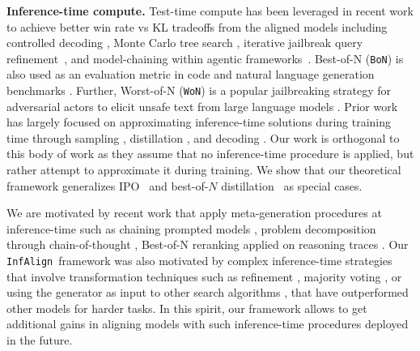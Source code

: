 \documentclass{article}
\newcommand{\iapo}{\texttt{InfAlign}\xspace}
\newcommand{\bofn}{\texttt{BoN}\xspace}
\newcommand{\wofn}{\texttt{WoN}\xspace}
\begin{document}
%
%
%
%

\textbf{Inference-time compute.}
Test-time compute has been leveraged in recent work \citep{snell2024scaling, brown2024large, wu2024empirical} to achieve better win rate vs KL tradeoffs from the aligned models including controlled decoding \citep{mudgal2023controlled, chakraborty2024transfer}, 
Monte Carlo tree search \citep{chaffin-etal-2022-ppl, scialom2021beam, zhaoprobabilistic2024}, 
iterative jailbreak query refinement~\citep{pair}, and model-chaining within agentic frameworks~\citep{gurreal2024}. Best-of-N (\bofn) is also used as an evaluation metric in code and natural language generation benchmarks \citep{stiennon2020learning, chen2021evaluating}. Further, Worst-of-N (\wofn) is a popular jailbreaking strategy for adversarial actors to elicit unsafe text from large language models \citep{hughes2024bestofnjailbreaking}. Prior work has largely focused on approximating inference-time solutions during training time through sampling \citep{gui2024bonbonalignmentlargelanguage, amini2024variationalbestofnalignment}, distillation \citep{sessa2024bondaligningllmsbestofn}, and decoding \citep{qiu2024treebon}. Our work is orthogonal to this body of work as they assume that no inference-time procedure is applied, but rather attempt to approximate it during training. We show that our theoretical framework generalizes IPO~\citep{azar2023general} and best-of-$N$ distillation~\citep{gui2024bonbonalignmentlargelanguage, amini2024variationalbestofnalignment, sessa2024bondaligningllmsbestofn} as special cases. 

We are motivated by recent work that apply meta-generation procedures \citep{welleck2024decoding} at inference-time such as chaining prompted models \citep{brown2024large}, problem decomposition through chain-of-thought \citep{wei2022chain}, Best-of-N reranking \citep{collins-koo-2005-discriminative, charniak-johnson-2005-coarse, pauls-klein-2009-k} applied on reasoning traces \citep{o1}.  Our \iapo\ framework was also motivated by complex inference-time strategies that involve transformation techniques such as refinement \citep{madaan2024self}, majority voting \citep{wang2022self}, or using the generator as input to other search algorithms \citep{yao2024tree}, that have outperformed other models for harder tasks. In this spirit, our framework allows to get additional gains in aligning models with such inference-time procedures deployed in the future.

%


%
%
\end{document}
